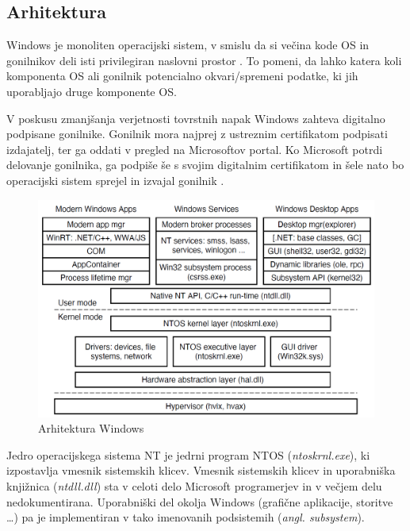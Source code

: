 \documentclass[a4paper,12pt,openright]{book}
\begin{document}
\subsection{Arhitektura} \label{ssec:windows:architecture}

Windows je monoliten operacijski sistem, v smislu da si večina kode OS in gonilnikov deli isti privilegiran naslovni prostor \cite{Yosifovich_Russinovich_Solomon_Ionescu_2017}.
To pomeni, da lahko katera koli komponenta OS ali gonilnik potencialno okvari/spremeni podatke, ki jih uporabljajo druge komponente OS.

V poskusu zmanjšanja verjetnosti tovrstnih napak Windows zahteva digitalno podpisane gonilnike.
Gonilnik mora najprej z ustreznim certifikatom podpisati izdajatelj, ter ga oddati v pregled na Microsoftov portal.
Ko Microsoft potrdi delovanje gonilnika, ga podpiše še s svojim digitalnim certifikatom in šele nato bo operacijski sistem sprejel in izvajal gonilnik \cite{Yosifovich_Russinovich_Solomon_Ionescu_2017}.

\begin{figure}[h!]
	\begin{center}
		\includegraphics[width=\textwidth]{images/windows_programming_layers.png}
	\end{center}
	\caption{Arhitektura Windows \cite{Tanenbaum_Bos_2023}}
	\label{fig:windows_architecture}
\end{figure}

Jedro operacijskega sistema NT je jedrni program NTOS (\textit{ntoskrnl.exe}), ki izpostavlja vmesnik sistemskih klicev.
Vmesnik sistemskih klicev in uporabniška knjižnica (\textit{ntdll.dll}) sta v celoti delo Microsoft programerjev in v večjem delu nedokumentirana.
Uporabniški del okolja Windows (grafične aplikacije, storitve \dots) pa je implementiran v tako imenovanih podsistemih (\textit{angl. subsystem}).
\end{document}
